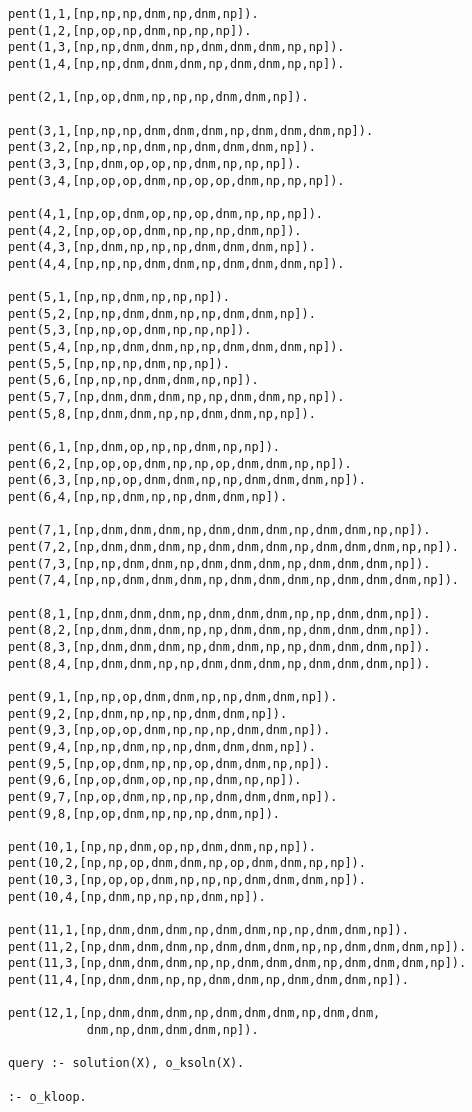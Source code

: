\begin{verbatim}
pent(1,1,[np,np,np,dnm,np,dnm,np]).
pent(1,2,[np,op,np,dnm,np,np,np]).
pent(1,3,[np,np,dnm,dnm,np,dnm,dnm,dnm,np,np]).
pent(1,4,[np,np,dnm,dnm,dnm,np,dnm,dnm,np,np]).

pent(2,1,[np,op,dnm,np,np,np,dnm,dnm,np]).

pent(3,1,[np,np,np,dnm,dnm,dnm,np,dnm,dnm,dnm,np]).
pent(3,2,[np,np,np,dnm,np,dnm,dnm,dnm,np]).
pent(3,3,[np,dnm,op,op,np,dnm,np,np,np]).
pent(3,4,[np,op,op,dnm,np,op,op,dnm,np,np,np]).

pent(4,1,[np,op,dnm,op,np,op,dnm,np,np,np]).
pent(4,2,[np,op,op,dnm,np,np,np,dnm,np]).
pent(4,3,[np,dnm,np,np,np,dnm,dnm,dnm,np]).
pent(4,4,[np,np,np,dnm,dnm,np,dnm,dnm,dnm,np]).

pent(5,1,[np,np,dnm,np,np,np]).
pent(5,2,[np,np,dnm,dnm,np,np,dnm,dnm,np]).
pent(5,3,[np,np,op,dnm,np,np,np]).
pent(5,4,[np,np,dnm,dnm,np,np,dnm,dnm,dnm,np]).
pent(5,5,[np,np,np,dnm,np,np]).
pent(5,6,[np,np,np,dnm,dnm,np,np]).
pent(5,7,[np,dnm,dnm,dnm,np,np,dnm,dnm,np,np]).
pent(5,8,[np,dnm,dnm,np,np,dnm,dnm,np,np]).

pent(6,1,[np,dnm,op,np,np,dnm,np,np]).
pent(6,2,[np,op,op,dnm,np,np,op,dnm,dnm,np,np]).
pent(6,3,[np,np,op,dnm,dnm,np,np,dnm,dnm,dnm,np]).
pent(6,4,[np,np,dnm,np,np,dnm,dnm,np]).

pent(7,1,[np,dnm,dnm,dnm,np,dnm,dnm,dnm,np,dnm,dnm,np,np]).
pent(7,2,[np,dnm,dnm,dnm,np,dnm,dnm,dnm,np,dnm,dnm,dnm,np,np]).
pent(7,3,[np,np,dnm,dnm,np,dnm,dnm,dnm,np,dnm,dnm,dnm,np]).
pent(7,4,[np,np,dnm,dnm,dnm,np,dnm,dnm,dnm,np,dnm,dnm,dnm,np]).

pent(8,1,[np,dnm,dnm,dnm,np,dnm,dnm,dnm,np,np,dnm,dnm,np]).
pent(8,2,[np,dnm,dnm,dnm,np,np,dnm,dnm,np,dnm,dnm,dnm,np]).
pent(8,3,[np,dnm,dnm,dnm,np,dnm,dnm,np,np,dnm,dnm,dnm,np]).
pent(8,4,[np,dnm,dnm,np,np,dnm,dnm,dnm,np,dnm,dnm,dnm,np]).

pent(9,1,[np,np,op,dnm,dnm,np,np,dnm,dnm,np]).
pent(9,2,[np,dnm,np,np,np,dnm,dnm,np]).
pent(9,3,[np,op,op,dnm,np,np,np,dnm,dnm,np]).
pent(9,4,[np,np,dnm,np,np,dnm,dnm,dnm,np]).
pent(9,5,[np,op,dnm,np,np,op,dnm,dnm,np,np]).
pent(9,6,[np,op,dnm,op,np,np,dnm,np,np]).
pent(9,7,[np,op,dnm,np,np,np,dnm,dnm,dnm,np]).
pent(9,8,[np,op,dnm,np,np,np,dnm,np]).

pent(10,1,[np,np,dnm,op,np,dnm,dnm,np,np]).
pent(10,2,[np,np,op,dnm,dnm,np,op,dnm,dnm,np,np]).
pent(10,3,[np,op,op,dnm,np,np,np,dnm,dnm,dnm,np]).
pent(10,4,[np,dnm,np,np,np,dnm,np]).

pent(11,1,[np,dnm,dnm,dnm,np,dnm,dnm,np,np,dnm,dnm,np]).
pent(11,2,[np,dnm,dnm,dnm,np,dnm,dnm,dnm,np,np,dnm,dnm,dnm,np]).
pent(11,3,[np,dnm,dnm,dnm,np,np,dnm,dnm,dnm,np,dnm,dnm,dnm,np]).
pent(11,4,[np,dnm,dnm,np,np,dnm,dnm,np,dnm,dnm,dnm,np]).

pent(12,1,[np,dnm,dnm,dnm,np,dnm,dnm,dnm,np,dnm,dnm,
           dnm,np,dnm,dnm,dnm,np]).

query :- solution(X), o_ksoln(X).

:- o_kloop.
\end{verbatim}

